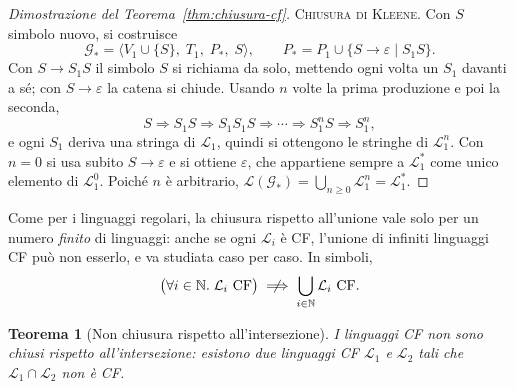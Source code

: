 \documentclass[a4paper, 11pt, oneside]{book}
\theoremstyle{formale}
\newtheorem{theorem}{Teorema}
\begin{document}
\begin{proof}[Dimostrazione del Teorema~\ref{thm:chiusura-cf}]
        \textsc{Chiusura di Kleene}. Con $S$ simbolo nuovo, si costruisce
        \begin{equation*}
            \mathcal{G}_* = \langle V_1 \cup \{S\},\; T_1,\; P_*,\; S \rangle,
            \qquad
            P_* = P_1 \cup \{S \to \varepsilon \mid S_1 S\}.
        \end{equation*}
        Con $S \to S_1 S$ il simbolo $S$ si richiama da solo, mettendo ogni volta un $S_1$
        davanti a s\'e; con $S \to \varepsilon$ la catena si chiude. Usando $n$ volte la
        prima produzione e poi la seconda,
        \begin{equation*}
            S \Rightarrow S_1 S \Rightarrow S_1 S_1 S \Rightarrow \cdots \Rightarrow
            S_1^n S \Rightarrow S_1^n,
        \end{equation*}
        e ogni $S_1$ deriva una stringa di $\mathcal{L}_1$, quindi si ottengono le
        stringhe di $\mathcal{L}_1^n$. Con $n = 0$ si usa subito $S \to \varepsilon$ e si
        ottiene $\varepsilon$, che appartiene sempre a $\mathcal{L}_1^*$ come unico
        elemento di $\mathcal{L}_1^0$. Poich\'e $n$ \`e arbitrario,
        $\mathcal{L}(\mathcal{G}_*) = \bigcup_{n \geq 0} \mathcal{L}_1^n
        = \mathcal{L}_1^*$.
    \end{proof}

    Come per i linguaggi regolari, la chiusura rispetto all'unione vale solo per un
    numero \emph{finito} di linguaggi: anche se ogni $\mathcal{L}_i$ \`e CF, l'unione di
    infiniti linguaggi CF pu\`o non esserlo, e va studiata caso per caso. In simboli,
    \begin{equation*}
        \bigl(\forall i \in \mathbb{N}.\; \mathcal{L}_i \text{ CF}\bigr)
        \centernot\implies \bigcup_{i \in \mathbb{N}} \mathcal{L}_i \text{ CF}.
    \end{equation*}

    \begin{theorem}[Non chiusura rispetto all'intersezione]
        \label{thm:cf-intersezione}
        I linguaggi CF \emph{non} sono chiusi rispetto all'intersezione: esistono due
        linguaggi CF $\mathcal{L}_1$ e $\mathcal{L}_2$ tali che
        $\mathcal{L}_1 \cap \mathcal{L}_2$ non \`e CF.
    \end{theorem}
\end{document}
